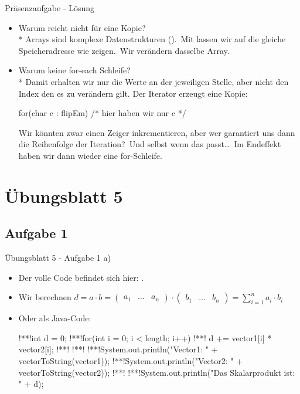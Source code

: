 \begin{frame}[t,fragile]{Präsenzaufgabe - Lösung}
    \begin{itemize}[<+(1)->]
        \itemsep8pt
        \item Warum reicht  nicht für eine Kopie?\smallskip\\*
            \pause Arrays sind komplexe Datenstrukturen ().\pause\ Mit  lassen wir  auf die gleiche Speicheradresse wie  zeigen.\pause\ Wir verändern dasselbe Array.
        \item Warum keine for-each Schleife?\smallskip\\*
            \pause Damit erhalten wir nur die Werte an der jeweiligen Stelle, aber nicht den Index den es zu verändern gilt. Der Iterator erzeugt eine Kopie:\pause
\begin{plainjava}
for(char c : flipEm) { /* hier haben wir nur c */ }
\end{plainjava}
        \pause Wir könnten zwar einen Zeiger inkrementieren, aber wer garantiert uns dann die Reihenfolge der Iteration?\pause\ Und selbst wenn das passt\ldots\pause\ Im Endeffekt haben wir dann wieder eine for-Schleife.
    \end{itemize}
\end{frame}


\section{Übungsblatt 5}
\subsection{Aufgabe 1}
\begin{frame}[t,fragile]{Übungsblatt 5 - Aufgabe 1 a)}
    \begin{itemize}[<+(1)->]
        \item Der volle Code befindet sich hier: .
        \item Wir berechnen \(d = a \cdot b = (\begin{smallmatrix}
            a_1 & \ldots & a_n
        \end{smallmatrix}) \cdot (\begin{smallmatrix}
            b_1 & \ldots & b_n
        \end{smallmatrix}) = \sum_{i = 1}^n a_i \cdot b_i\)
        \item Oder als Java-Code:
\begin{plainjava}
!**!int d = 0;
!**!for(int i = 0; i < length; i++) {
!**!    d += vector1[i] * vector2[i];
!**!}
!**!
!**!System.out.println("Vector1: " + vectorToString(vector1));
!**!System.out.println("Vector2: " + vectorToString(vector2));
!**!
!**!System.out.println("Das Skalarprodukt ist: " + d);
\end{plainjava}
    \end{itemize}
\end{frame}

